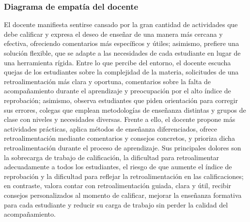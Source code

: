 \documentclass[letterpaper, 10 pt, conference]{ieeeconf}
\begin{document}
\subsubsection{Diagrama de empatía del docente}
El docente manifiesta sentirse cansado por la gran cantidad de actividades que debe calificar y expresa el deseo de enseñar de una manera más cercana y efectiva, ofreciendo comentarios más específicos y útiles; asimismo, prefiere una solución flexible, que se adapte a las necesidades de cada estudiante en lugar de una herramienta rígida. Entre lo que percibe del entorno, el docente escucha quejas de los estudiantes sobre la complejidad de la materia, solicitudes de una retroalimentación más clara y oportuna, comentarios sobre la falta de acompañamiento durante el aprendizaje y preocupación por el alto índice de reprobación; asimismo, observa estudiantes que piden orientación para corregir sus errores, colegas que emplean metodologías de enseñanza distintas y grupos de clase con niveles y necesidades diversas. Frente a ello, el docente propone más actividades prácticas, aplica métodos de enseñanza diferenciados, ofrece retroalimentación mediante comentarios y consejos concretos, y prioriza dicha retroalimentación durante el proceso de aprendizaje. Sus principales dolores son la sobrecarga de trabajo de calificación, la dificultad para retroalimentar adecuadamente a todos los estudiantes, el riesgo de que aumente el índice de reprobación y la dificultad para reflejar la retroalimentación en las calificaciones; en contraste, valora contar con retroalimentación guiada, clara y útil, recibir consejos personalizados al momento de calificar, mejorar la enseñanza formativa para cada estudiante y reducir su carga de trabajo sin perder la calidad del acompañamiento.
\end{document}
